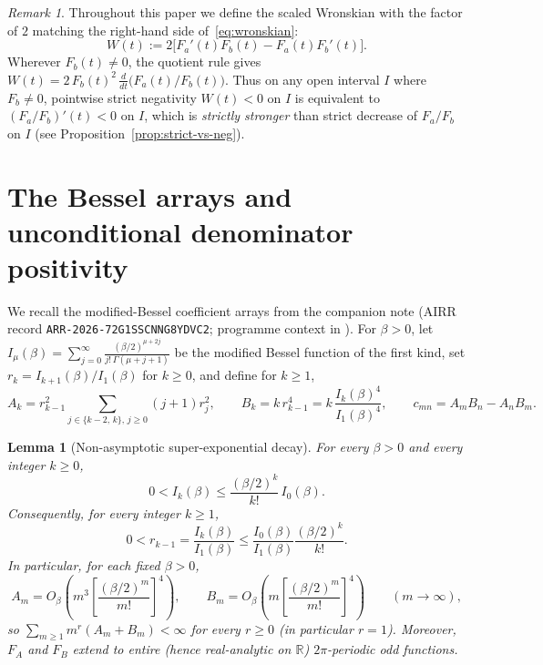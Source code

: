 \documentclass[11pt]{article}
\newtheorem{lemma}[theorem]{Lemma}
\theoremstyle{remark}
\newtheorem{remark}[theorem]{Remark}
\begin{document}
\begin{remark}
Throughout this paper we define the scaled Wronskian with the factor of $2$ matching the
right-hand side of~\eqref{eq:wronskian}:
\[
W(t) := 2\bigl[F_a'(t) F_b(t) - F_a(t) F_b'(t)\bigr].
\]
Wherever $F_b(t) \neq 0$, the quotient rule gives
$W(t) = 2\,F_b(t)^2\,\frac{d}{dt}\bigl(F_a(t)/F_b(t)\bigr)$.
Thus on any open interval $I$ where $F_b \neq 0$, pointwise strict negativity $W(t) < 0$
on $I$ is equivalent to $(F_a/F_b)'(t) < 0$ on $I$, which is \emph{strictly stronger} than
strict decrease of $F_a/F_b$ on $I$ (see Proposition~\ref{prop:strict-vs-neg}).
\end{remark}

\section{The Bessel arrays and unconditional denominator positivity}
\label{sec:surface}

We recall the modified-Bessel coefficient arrays from the companion note \cite{PhiLemma}
(AIRR record \texttt{ARR-2026-72G1SSCNNG8YDVC2}; programme context in \cite{MasterMap}).
For $\beta > 0$, let $I_\mu(\beta) = \sum_{j=0}^\infty \frac{(\beta/2)^{\mu+2j}}{j!\,\Gamma(\mu+j+1)}$
be the modified Bessel function of the first kind, set $r_k = I_{k+1}(\beta)/I_1(\beta)$ for
$k \ge 0$, and define for $k \ge 1$,
\[
A_k = r_{k-1}^2 \!\!\sum_{j \in \{k-2,\,k\},\, j \ge 0}\!\! (j+1) r_j^2,
\qquad
B_k = k\, r_{k-1}^4 = k\,\frac{I_k(\beta)^4}{I_1(\beta)^4},
\qquad
c_{mn} = A_m B_n - A_n B_m .
\]

\begin{lemma}[Non-asymptotic super-exponential decay]
\label{lem:bessel-decay}
For every $\beta > 0$ and every integer $k \ge 0$,
\[
0 < I_k(\beta) \le \frac{(\beta/2)^k}{k!}\,I_0(\beta).
\]
Consequently, for every integer $k \ge 1$,
\[
0 < r_{k-1} = \frac{I_k(\beta)}{I_1(\beta)} \le \frac{I_0(\beta)}{I_1(\beta)}\frac{(\beta/2)^k}{k!}.
\]
In particular, for each fixed $\beta > 0$,
\[
A_m = O_\beta\!\left(m^3\left[\frac{(\beta/2)^m}{m!}\right]^4\right),
\qquad
B_m = O_\beta\!\left(m\left[\frac{(\beta/2)^m}{m!}\right]^4\right)
\qquad (m \to \infty),
\]
so $\sum_{m\ge 1} m^r(A_m + B_m) < \infty$ for every $r \ge 0$ (in particular $r=1$).
Moreover, $F_A$ and $F_B$ extend to entire (hence real-analytic on $\mathbb{R}$)
$2\pi$-periodic odd functions.
\end{lemma}
\end{document}
